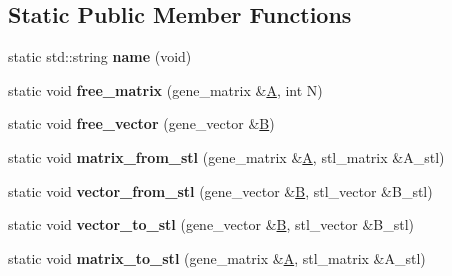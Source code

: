 \subsection*{Static Public Member Functions}
\begin{DoxyCompactItemize}
\item 
\mbox{\label{classgmm__interface_a847915dbbfe39cc8a4c084f7cf32e467}} 
static std\+::string {\bfseries name} (void)
\item 
\mbox{\label{classgmm__interface_a9c8560b6e2eecaac270e030c20f37f33}} 
static void {\bfseries free\+\_\+matrix} (gene\+\_\+matrix \&\hyperlink{group___core___module_class_eigen_1_1_matrix}{A}, int N)
\item 
\mbox{\label{classgmm__interface_a17da0b9e23043f5c1a825b9c39e826e0}} 
static void {\bfseries free\+\_\+vector} (gene\+\_\+vector \&\hyperlink{group___core___module_class_eigen_1_1_matrix}{B})
\item 
\mbox{\label{classgmm__interface_a0017598ebb0651e556ccf7a2080efde5}} 
static void {\bfseries matrix\+\_\+from\+\_\+stl} (gene\+\_\+matrix \&\hyperlink{group___core___module_class_eigen_1_1_matrix}{A}, stl\+\_\+matrix \&A\+\_\+stl)
\item 
\mbox{\label{classgmm__interface_a695e75d14e15e7e942cbcb083b27e745}} 
static void {\bfseries vector\+\_\+from\+\_\+stl} (gene\+\_\+vector \&\hyperlink{group___core___module_class_eigen_1_1_matrix}{B}, stl\+\_\+vector \&B\+\_\+stl)
\item 
\mbox{\label{classgmm__interface_a268696c22120ed1a4145224c668e6a25}} 
static void {\bfseries vector\+\_\+to\+\_\+stl} (gene\+\_\+vector \&\hyperlink{group___core___module_class_eigen_1_1_matrix}{B}, stl\+\_\+vector \&B\+\_\+stl)
\item 
\mbox{\label{classgmm__interface_ac0d36266a607a0834ab7c3a0916f3a09}} 
static void {\bfseries matrix\+\_\+to\+\_\+stl} (gene\+\_\+matrix \&\hyperlink{group___core___module_class_eigen_1_1_matrix}{A}, stl\+\_\+matrix \&A\+\_\+stl)
\item 
\mbox{\label{classgmm__interface_aa5ad7ea760e34c5e20ce806a00611d75}} 

\end{DoxyCompactItemize}
